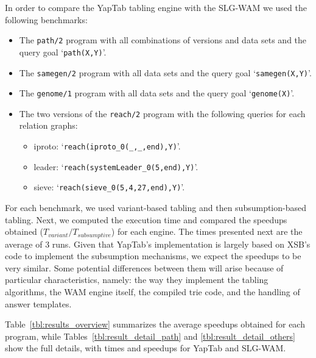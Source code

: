 In order to compare the YapTab tabling engine with the SLG-WAM we used the following benchmarks:

\begin{itemize}
   \item The \texttt{path/2} program with all combinations of versions and data sets and the query goal `\texttt{path(X,Y)}'.
   
   \item The \texttt{samegen/2} program with all data sets and the query goal `\texttt{samegen(X,Y)}'.
   
   \item The \texttt{genome/1} program with all data sets and the query goal `\texttt{genome(X)}'.
   
   \item The two versions of the \texttt{reach/2} program with the following queries for each relation graphs:

   \begin{itemize}
      \item iproto: `\texttt{reach(iproto\_0(\_,\_,end),Y)}'.
      \item leader: `\texttt{reach(systemLeader\_0(5,end),Y)}'.
      \item sieve: `\texttt{reach(sieve\_0(5,4,27,end),Y)}'.
   \end{itemize}

\end{itemize}

For each benchmark, we used variant-based tabling and then subsumption-based tabling.
Next, we computed the execution time and compared the speedups obtained ($T_{variant} / T_{subsumptive}$) for
each engine. The times presented next are the average of 3 runs. Given that YapTab's implementation
is largely based on XSB's code to implement the subsumption mechanisms,
we expect the speedups to be very similar. Some potential differences between them will arise because
of particular characteristics, namely: the way they implement the tabling algorithms, the WAM engine itself,
the compiled trie code, and the handling of answer templates.

Table~\ref{tbl:results_overview} summarizes the average speedups obtained for each program,
while Tables~\ref{tbl:result_detail_path} and \ref{tbl:result_detail_others}
show the full details, with times and speedups for YapTab and SLG-WAM.

